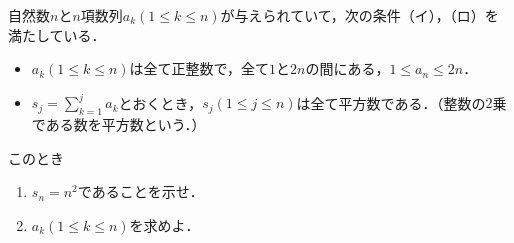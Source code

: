 \documentclass[../../main.tex]{subfiles}
\begin{document}
自然数$n$と$n$項数列$a_k (1\le k\le n)$が与えられていて，次の条件（イ），（ロ）を満たしている．
\begin{itemize}
  \item[（イ）] $a_k(1\le k\le n)$は全て正整数で，全て$1$と$2n$の間にある，$1\le a_n\le 2n$．
  \item[（ロ）] $s_j=\sum_{k=1}^{j}a_k$とおくとき，$s_j(1\le j\le n)$は全て平方数である．（整数の$2$乗である数を平方数という．）
\end{itemize}
このとき
\begin{enumerate}
  \item $s_n=n^2$であることを示せ．
  \item $a_k(1\le k\le n)$を求めよ．
\end{enumerate}
\end{document}
